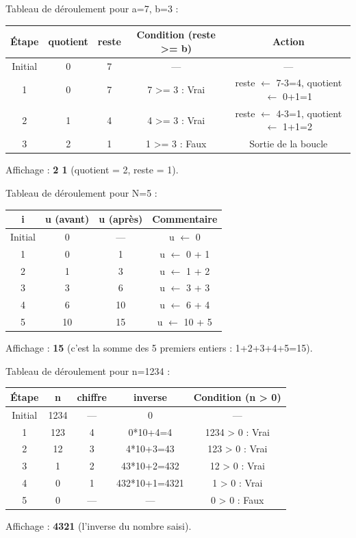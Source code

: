 Tableau de déroulement pour a=7, b=3 :

\begin{center}
\begin{tabular}{|c|c|c|c|c|}
\hline
\textbf{Étape} & \textbf{quotient} & \textbf{reste} & \textbf{Condition (reste >= b)} & \textbf{Action} \\
\hline
Initial & 0 & 7 & — & — \\
\hline
1 & 0 & 7 & 7 >= 3 : Vrai & reste $\leftarrow$ 7-3=4, quotient $\leftarrow$ 0+1=1 \\
\hline
2 & 1 & 4 & 4 >= 3 : Vrai & reste $\leftarrow$ 4-3=1, quotient $\leftarrow$ 1+1=2 \\
\hline
3 & 2 & 1 & 1 >= 3 : Faux & Sortie de la boucle \\
\hline
\end{tabular}
\end{center}
Affichage : \textbf{2 1} (quotient = 2, reste = 1).

Tableau de déroulement pour N=5 :

\begin{center}
\begin{tabular}{|c|c|c|c|}
\hline
\textbf{i} & \textbf{u (avant)} & \textbf{u (après)} & \textbf{Commentaire} \\
\hline
Initial & 0 & — & u $\leftarrow$ 0 \\
\hline
1 & 0 & 1 & u $\leftarrow$ 0 + 1 \\
\hline
2 & 1 & 3 & u $\leftarrow$ 1 + 2 \\
\hline
3 & 3 & 6 & u $\leftarrow$ 3 + 3 \\
\hline
4 & 6 & 10 & u $\leftarrow$ 6 + 4 \\
\hline
5 & 10 & 15 & u $\leftarrow$ 10 + 5 \\
\hline
\end{tabular}
\end{center}
Affichage : \textbf{15} (c'est la somme des 5 premiers entiers : 1+2+3+4+5=15).

Tableau de déroulement pour n=1234 :

\begin{center}
\begin{tabular}{|c|c|c|c|c|}
\hline
\textbf{Étape} & \textbf{n} & \textbf{chiffre} & \textbf{inverse} & \textbf{Condition (n > 0)} \\
\hline
Initial & 1234 & — & 0 & — \\
\hline
1 & 123 & 4 & 0*10+4=4 & 1234 > 0 : Vrai \\
\hline
2 & 12 & 3 & 4*10+3=43 & 123 > 0 : Vrai \\
\hline
3 & 1 & 2 & 43*10+2=432 & 12 > 0 : Vrai \\
\hline
4 & 0 & 1 & 432*10+1=4321 & 1 > 0 : Vrai \\
\hline
5 & 0 & — & — & 0 > 0 : Faux \\
\hline
\end{tabular}
\end{center}
Affichage : \textbf{4321} (l'inverse du nombre saisi).

